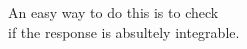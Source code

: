 \documentclass[preview]{standalone}
\begin{document}
\begin{center}
An easy way to do this is to check \\ if the response is absultely integrable.
\end{center}
\end{document}
